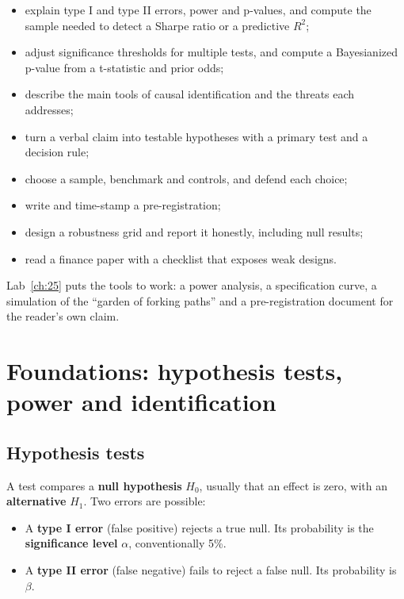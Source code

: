 \begin{itemize}
  \item explain type I and type II errors, power and p-values, and compute the sample needed to detect a Sharpe ratio or a predictive $R^2$;
  \item adjust significance thresholds for multiple tests, and compute a Bayesianized p-value from a t-statistic and prior odds;
  \item describe the main tools of causal identification and the threats each addresses;
  \item turn a verbal claim into testable hypotheses with a primary test and a decision rule;
  \item choose a sample, benchmark and controls, and defend each choice;
  \item write and time-stamp a pre-registration;
  \item design a robustness grid and report it honestly, including null results;
  \item read a finance paper with a checklist that exposes weak designs.
\end{itemize}

Lab~\ref{ch:25} puts the tools to work: a power analysis, a specification curve, a simulation of the ``garden of forking paths'' and a pre-registration document for the reader's own claim.

\section{Foundations: hypothesis tests, power and identification}
\label{sec:25-foundations}

\subsection{Hypothesis tests}

A test compares a \textbf{null hypothesis} $H_0$, usually that an effect is zero, with an \textbf{alternative} $H_1$. Two errors are possible:

\begin{itemize}
  \item A \textbf{type I error} (false positive) rejects a true null. Its probability is the \textbf{significance level} $\alpha$, conventionally 5\%.
  \item A \textbf{type II error} (false negative) fails to reject a false null. Its probability is $\beta$.
\end{itemize}

